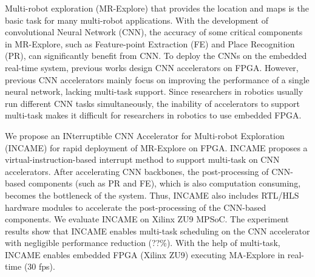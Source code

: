 Multi-robot exploration (MR-Explore) that provides the location and maps is the basic task for many multi-robot applications. 
With the development of convolutional Neural Network (CNN), the accuracy of some critical components in MR-Explore, such as Feature-point Extraction (FE) and Place Recognition (PR), can significantly benefit from CNN. 
To deploy the CNNs on the embedded real-time system, previous works design CNN accelerators on FPGA. 
However, previous CNN accelerators mainly focus on improving the performance of a single neural network, lacking multi-task support.
Since researchers in robotics usually run different CNN tasks simultaneously, the inability of accelerators to support multi-task makes it difficult for researchers in robotics to use embedded FPGA.

We propose an INterruptible CNN Accelerator for Multi-robot Exploration (INCAME) for rapid deployment of MR-Explore on FPGA.
INCAME proposes a virtual-instruction-based interrupt method to support multi-task on CNN accelerators.
After accelerating  CNN backbones, the post-processing of  CNN-based components (such as PR and FE), which is also computation consuming, becomes the bottleneck of the system.
Thus, INCAME also includes RTL/HLS hardware modules to accelerate the post-processing of the CNN-based components.
We evaluate INCAME on Xilinx ZU9 MPSoC. The experiment results show that INCAME enables multi-task scheduling on the CNN accelerator with negligible performance reduction (??\%). With the help of multi-task, INCAME enables embedded FPGA (Xilinx ZU9) executing MA-Explore in real-time (30 fps).


